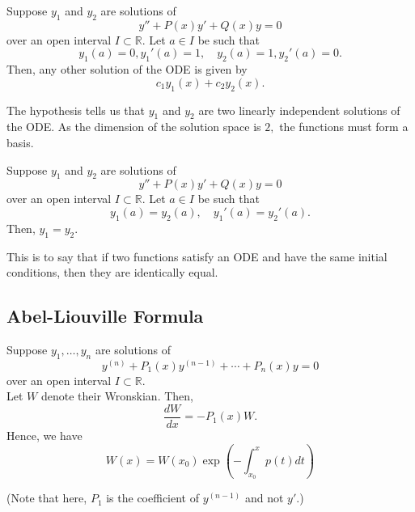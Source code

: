 \begin{mdframed}[style=boxstyle, frametitle={A particular application}]
	Suppose $y_1$ and $y_2$ are solutions of
	\[y'' + P(x)y' + Q(x)y = 0\]
	over an open interval $I \subset \mathbb{R}.$ Let $a \in I$ be such that
	\[y_1(a) = 0, y_1'(a) = 1,\quad y_2(a) = 1, y_2'(a) = 0.\]
	Then, any other solution of the ODE is given by
	\[c_1y_1(x) + c_2y_2(x).\]
\end{mdframed}
The hypothesis tells us that $y_1$ and $y_2$ are two linearly independent solutions of the ODE. As the dimension of the solution space is $2,$ the functions must form a basis.
\begin{mdframed}[style=boxstyle, frametitle={A result}]
	Suppose $y_1$ and $y_2$ are solutions of
	\[y'' + P(x)y' + Q(x)y = 0\]
	over an open interval $I \subset \mathbb{R}.$ Let $a \in I$ be such that
	\[y_1(a) = y_2(a),\quad y_1'(a) =y_2'(a).\]
	Then, $y_1 = y_2.$
\end{mdframed}
This is to say that if two functions satisfy an ODE and have the same initial conditions, then they are identically equal.

\newpage

\subsection{Abel-Liouville Formula}
\begin{mdframed}[style=boxstyle, frametitle={The formula}]
	Suppose $y_1, \ldots, y_n$ are solutions of
	\[y^{(n)} + P_1(x)y^{(n-1)} + \cdots + P_n(x)y = 0\]
	over an open interval $I \subset \mathbb{R}.$\\
	Let $W$ denote their Wronskian.	Then,
	\[\dfrac{dW}{dx} = -P_1(x)W.\]
	Hence, we have
	\[W(x) = W(x_0)\exp\left(-\int_{x_0}^{x} p(t) dt\right)\]
\end{mdframed}
(Note that here, $P_1$ is the coefficient of $y^{(n-1)}$ and not $y'$.)


